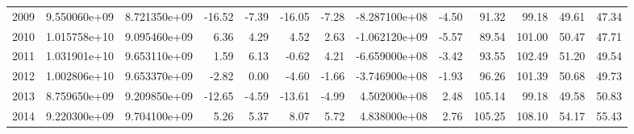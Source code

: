 \documentclass[12pt]{book}
\begin{document}
{\begin{tabular}{lrrrrrrrrrrrr}
2009 &                          9.550060e+09 &                          8.721350e+09 &                                        -16.52 &                                         -7.39 &                                     -16.05 &                                      -7.28 &          -8.287100e+08 &                    -4.50 &                  91.32 &                 99.18 &                                 49.61 &                   47.34 \\
2010 &                          1.015758e+10 &                          9.095460e+09 &                                          6.36 &                                          4.29 &                                       4.52 &                                       2.63 &          -1.062120e+09 &                    -5.57 &                  89.54 &                101.00 &                                 50.47 &                   47.71 \\
2011 &                          1.031901e+10 &                          9.653110e+09 &                                          1.59 &                                          6.13 &                                      -0.62 &                                       4.21 &          -6.659000e+08 &                    -3.42 &                  93.55 &                102.49 &                                 51.20 &                   49.54 \\
2012 &                          1.002806e+10 &                          9.653370e+09 &                                         -2.82 &                                          0.00 &                                      -4.60 &                                      -1.66 &          -3.746900e+08 &                    -1.93 &                  96.26 &                101.39 &                                 50.68 &                   49.73 \\
2013 &                          8.759650e+09 &                          9.209850e+09 &                                        -12.65 &                                         -4.59 &                                     -13.61 &                                      -4.99 &           4.502000e+08 &                     2.48 &                 105.14 &                 99.18 &                                 49.58 &                   50.83 \\
2014 &                          9.220300e+09 &                          9.704100e+09 &                                          5.26 &                                          5.37 &                                       8.07 &                                       5.72 &           4.838000e+08 &                     2.76 &                 105.25 &                108.10 &                                 54.17 &                   55.43 \\
\bottomrule
\end{tabular}
}
\end{document}
